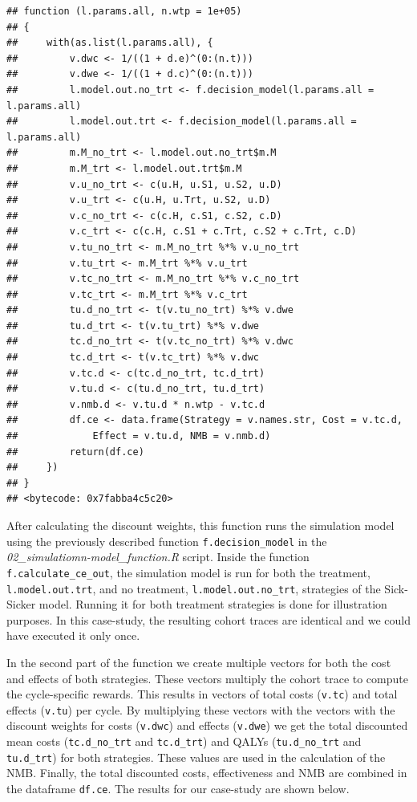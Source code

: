 \documentclass[]{article}
\begin{document}
\begin{verbatim}
## function (l.params.all, n.wtp = 1e+05) 
## {
##     with(as.list(l.params.all), {
##         v.dwc <- 1/((1 + d.e)^(0:(n.t)))
##         v.dwe <- 1/((1 + d.c)^(0:(n.t)))
##         l.model.out.no_trt <- f.decision_model(l.params.all = l.params.all)
##         l.model.out.trt <- f.decision_model(l.params.all = l.params.all)
##         m.M_no_trt <- l.model.out.no_trt$m.M
##         m.M_trt <- l.model.out.trt$m.M
##         v.u_no_trt <- c(u.H, u.S1, u.S2, u.D)
##         v.u_trt <- c(u.H, u.Trt, u.S2, u.D)
##         v.c_no_trt <- c(c.H, c.S1, c.S2, c.D)
##         v.c_trt <- c(c.H, c.S1 + c.Trt, c.S2 + c.Trt, c.D)
##         v.tu_no_trt <- m.M_no_trt %*% v.u_no_trt
##         v.tu_trt <- m.M_trt %*% v.u_trt
##         v.tc_no_trt <- m.M_no_trt %*% v.c_no_trt
##         v.tc_trt <- m.M_trt %*% v.c_trt
##         tu.d_no_trt <- t(v.tu_no_trt) %*% v.dwe
##         tu.d_trt <- t(v.tu_trt) %*% v.dwe
##         tc.d_no_trt <- t(v.tc_no_trt) %*% v.dwc
##         tc.d_trt <- t(v.tc_trt) %*% v.dwc
##         v.tc.d <- c(tc.d_no_trt, tc.d_trt)
##         v.tu.d <- c(tu.d_no_trt, tu.d_trt)
##         v.nmb.d <- v.tu.d * n.wtp - v.tc.d
##         df.ce <- data.frame(Strategy = v.names.str, Cost = v.tc.d, 
##             Effect = v.tu.d, NMB = v.nmb.d)
##         return(df.ce)
##     })
## }
## <bytecode: 0x7fabba4c5c20>
\end{verbatim}

After calculating the discount weights, this function runs the
simulation model using the previously described function
\texttt{f.decision\_model} in the
\emph{02\_simulatiomn-model\_function.R} script. Inside the function
\texttt{f.calculate\_ce\_out}, the simulation model is run for both the
treatment, \texttt{l.model.out.trt}, and no treatment,
\texttt{l.model.out.no\_trt}, strategies of the Sick-Sicker model.
Running it for both treatment strategies is done for illustration
purposes. In this case-study, the resulting cohort traces are identical
and we could have executed it only once.

In the second part of the function we create multiple vectors for both
the cost and effects of both strategies. These vectors multiply the
cohort trace to compute the cycle-specific rewards. This results in
vectors of total costs (\texttt{v.tc}) and total effects (\texttt{v.tu})
per cycle. By multiplying these vectors with the vectors with the
discount weights for costs (\texttt{v.dwc}) and effects (\texttt{v.dwe})
we get the total discounted mean costs (\texttt{tc.d\_no\_trt} and
\texttt{tc.d\_trt}) and QALYs (\texttt{tu.d\_no\_trt} and
\texttt{tu.d\_trt}) for both strategies. These values are used in the
calculation of the NMB. Finally, the total discounted costs,
effectiveness and NMB are combined in the dataframe \texttt{df.ce}. The
results for our case-study are shown below.
\end{document}
